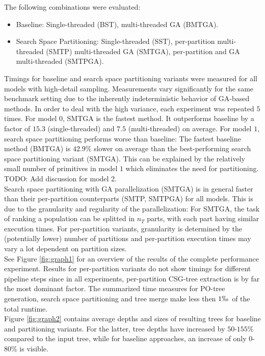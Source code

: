 The following combinations were evaluated:
\begin{itemize}
	\item Baseline: Single-threaded (BST), multi-threaded \ac{GA} (BMTGA).
	\item Search Space Partitioning: Single-threaded (SST), per-partition multi-threaded (SMTP) multi-threaded \ac{GA} (SMTGA), per-partition and \ac{GA} multi-threaded (SMTPGA).
\end{itemize}     
Timings for baseline and search space partitioning variants were measured for all models with high-detail sampling.
Measurements vary significantly for the same benchmark setting due to the inherently indeterministic behavior of \ac{GA}-based methods. 
In order to deal with the high variance, each experiment was repeated $5$ times.
For model $0$, SMTGA is the fastest method. 
It outperforms baseline by a factor of $15.3$ (single-threaded) and $7.5$ (multi-threaded) on average.
For model $1$, search space partitioning performs worse than baseline: 
The fastest baseline method (BMTGA) is $42.9\%$ slower on average than the best-performing search space partitioning variant (SMTGA).
This can be explained by the relatively small number of primitives in model $1$ which eliminates the need for partitioning.
\\
TODO: Add discussion for model 2.
\\
Search space partitioning with \ac{GA} parallelization (SMTGA) is in general faster than their per-partition counterparts (SMTP, SMTPGA) for all models.
This is due to the granularity and regularity of the parallelization: 
For SMTGA, the task of ranking a population can be splitted in $n_T$ parts, with each part having similar execution times.
For per-partition variants, granularity is determined by the (potentially lower) number of partitions and per-partition execution times may vary a lot dependent on partition sizes. 
\\
See Figure \ref{fig:graph1} for an overview of the results of the complete performance experiment.
Results for per-partition variants do not show timings for different pipeline steps since in all experiments, per-partition \ac{CSG}-tree extraction is by far the most dominant factor. 
The summarized time measures for \ac{PO}-tree generation, search space partitioning and tree merge make less then $1\permil$ of the total runtime.
\\
Figure \ref{fig:graph2} contains average depths and sizes of resulting trees for baseline and partitioning variants.
For the latter, tree depths have increased by $50$-$155\%$ compared to the input tree, while for baseline approaches, an increase of only $0$-$80\%$ is visible.
